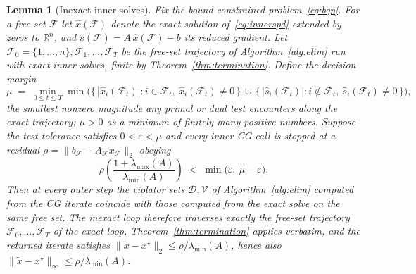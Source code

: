 \documentclass[10pt,a4paper]{amsart}
\newtheorem{lemma}{Lemma}
\begin{document}
\begin{lemma}[Inexact inner solves]\label{lem:inexact}
Fix the bound-constrained problem~\eqref{eq:bqp}. For a free set $\mathcal{F}$ let
$\hat x(\mathcal{F})$ denote the exact solution of~\eqref{eq:innerspd} extended by zeros to
$\mathbb{R}^n$, and $\hat s(\mathcal{F}) = A\,\hat x(\mathcal{F}) - b$ its reduced gradient.
Let $\mathcal{F}_0 = \{1,\dots,n\}, \mathcal{F}_1, \dots, \mathcal{F}_T$ be the free-set
trajectory of Algorithm~\ref{alg:elim} run with \emph{exact} inner solves, finite by
Theorem~\ref{thm:termination}. Define the \emph{decision margin}
\[
  \mu \;=\; \min_{0 \le t \le T} \min\Big(
    \big\{\, |\hat x_i(\mathcal{F}_t)| : i \in \mathcal{F}_t,\ \hat x_i(\mathcal{F}_t) \neq 0 \,\big\}
    \,\cup\,
    \big\{\, |\hat s_i(\mathcal{F}_t)| : i \notin \mathcal{F}_t,\ \hat s_i(\mathcal{F}_t) \neq 0 \,\big\}
  \Big),
\]
the smallest nonzero magnitude any primal or dual test encounters along the exact
trajectory; $\mu > 0$ as a minimum of finitely many positive numbers. Suppose the test
tolerance satisfies $0 < \varepsilon < \mu$ and every inner CG call is stopped at a residual
$\rho = \lVert b_{\mathcal{F}} - A_{\mathcal{F}}\tilde x_{\mathcal{F}} \rVert_2$ obeying
\begin{equation}\label{eq:inexactcond}
  \rho
  \left(\frac{1 + \lambda_{\max}(A)}{\lambda_{\min}(A)}\right)
  \;<\; \min\big(\varepsilon,\ \mu - \varepsilon\big).
\end{equation}
Then at every outer step the violator sets $\mathcal{D}, \mathcal{V}$ of
Algorithm~\ref{alg:elim} computed from the CG iterate coincide with those computed from the
exact solve on the same free set. The inexact loop therefore traverses exactly the free-set
trajectory $\mathcal{F}_0,\dots,\mathcal{F}_T$ of the exact loop, Theorem~\ref{thm:termination}
applies verbatim, and the returned iterate satisfies
$\lVert \tilde x - x^\star \rVert_2 \le \rho/\lambda_{\min}(A)$, hence also
$\lVert \tilde x - x^\star \rVert_\infty \le \rho/\lambda_{\min}(A)$.
\end{lemma}
\end{document}
